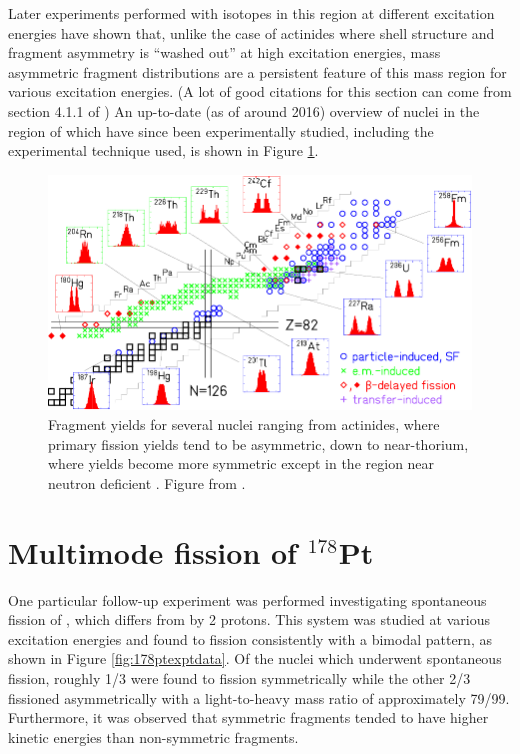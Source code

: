 Later experiments performed with isotopes in this region at different excitation energies have shown that, unlike the case of actinides where shell structure and fragment asymmetry is ``washed out'' at high excitation energies, mass asymmetric fragment distributions are a persistent feature of this mass region for various excitation energies. (A lot of good citations for this section can come from section 4.1.1 of \cite{Andreyev2018}) An up-to-date (as of around 2016) overview of nuclei in the region of {\Hg} which have since been experimentally studied, including the experimental technique used, is shown in Figure \ref{fig:178ptregion}.

\begin{figure}
	\centering
	\includegraphics[width=0.9\linewidth]{./TeX_files/178Pt_region}
	\caption[Survey of fragment yields near $^{180}$Hg]{Fragment yields for several nuclei ranging from actinides, where primary fission yields tend to be asymmetric, down to near-thorium, where yields become more symmetric except in the region near neutron deficient {\Hg}. Figure from \cite{Andreyev2018}.}
	\label{fig:178ptregion}
\end{figure}



\section{Multimode fission of $^{178}$Pt}

One particular follow-up experiment was performed investigating spontaneous fission of {\Pt} \cite{our-Pt-paper}, which differs from {\Hg} by 2 protons. This system was studied at various excitation energies and found to fission consistently with a bimodal pattern, as shown in Figure \ref{fig:178ptexptdata}. Of the nuclei which underwent spontaneous fission, roughly 1/3 were found to fission symmetrically while the other 2/3 fissioned asymmetrically with a light-to-heavy mass ratio of approximately 79/99. Furthermore, it was observed that symmetric fragments tended to have higher kinetic energies than non-symmetric fragments.

